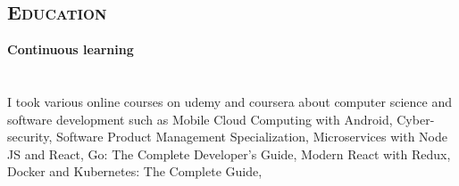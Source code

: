 \begin{resume}
%
%
%
%
%
%
%


        \section{\textsc{Education}}

        \textbf{Continuous learning} \ \ \ \ \ \ \ \ \ \ \ \ \ \ \ \ \ \ \ \ \ \ \ \ \ \ \ \ \ \ \ \ \ \ \ \ \ \ \ \ \ \ \ \ \ \ \ \ \ \ \ \ \ \ \ \ \ \ \ \ \ \ \ \ \ \ \ \ \ \ \ \ \ \ \ \ \ \ \ \ \ \  \\
        I took various online courses on udemy and coursera about computer science and software development such as
        Mobile Cloud Computing with Android, %
        Cyber-security, %
        Software Product Management Specialization, %
        Microservices with Node JS and React,
        Go: The Complete Developer's Guide,
        Modern React with Redux,
        Docker and Kubernetes: The Complete Guide,


\end{resume}

